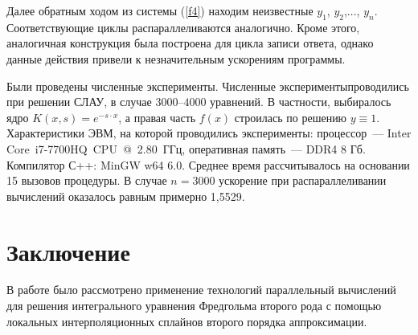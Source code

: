 \documentclass{spisok-article}
\begin{document}
Далее обратным ходом из системы (\ref{f4}) находим неизвестные $y_1$, $y_2$,$\ldots$, $y_n$. Соответствующие циклы распараллеливаются аналогично. Кроме этого, аналогичная конструкция была построена для цикла записи ответа, однако данные действия привели к незначительным ускорениям программы.

Были проведены численные эксперименты. Численные эксперименты\linebreak проводились при решении СЛАУ, в случае $3000$--$4000$ уравнений. В частности, выбиралось ядро $K\left(x,s\right)=e^{-s \cdot x}$, а правая часть $f\left(x\right)$ строилась по решению $y\equiv 1$. Характе­ристики ЭВМ, на которой проводились эксперименты: процессор~--- Inter Core~i7-7700HQ~CPU~@~2.80~ГГц, оперативная память~--- DDR4 8 Гб. Компилятор С++: MinGW w64 6.0. Среднее время рассчитывалось
на основании 15 вызовов процедуры. В случае $n=3000$ ускорение при распараллеливании вычислений оказалось равным примерно 1,5529.

\section{Заключение}

В работе было рассмотрено применение технологий параллельный вычислений для решения интегрального уравнения Фредгольма второго рода с помощью локальных интерполяционных сплайнов второго порядка аппроксимации.
\end{document}
